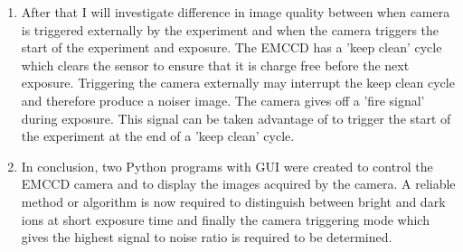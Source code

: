 \documentclass[12pt]{article}
\begin{document}
\begin{enumerate}
\item After that I will investigate difference in image quality between when camera is triggered externally by the experiment and when the camera triggers the start of the experiment and exposure. The EMCCD has a 'keep clean' cycle which clears the sensor to ensure that it is charge free before the next exposure. Triggering the camera externally may interrupt the keep clean cycle and therefore produce a noiser image. The camera gives off a 'fire signal' during exposure. This signal can be taken advantage of to trigger the start of the experiment at the end of a 'keep clean' cycle.

\item In conclusion, two Python programs with GUI were created to control the EMCCD camera and to display the images acquired by the camera. A reliable method or algorithm is now required to distinguish between bright and dark ions at short exposure time and finally the camera triggering mode which gives the highest signal to noise ratio is required to be determined.

\end{enumerate}
\end{document}
